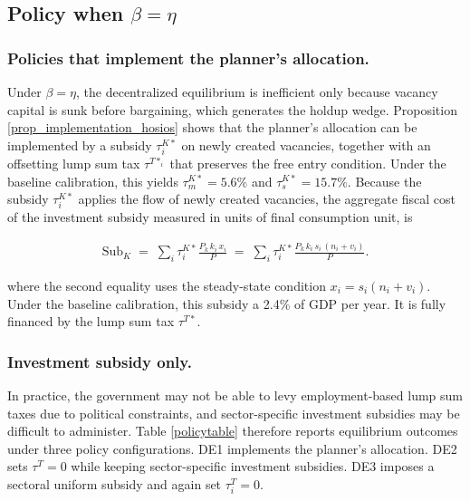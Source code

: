 \documentclass[12pt]{article} %
\theoremstyle{definition}
\begin{document}
\subsection{Policy when $\beta=\eta$}

\subsubsection{Policies that implement the planner's allocation.} Under $\beta=\eta$, the decentralized equilibrium is inefficient only because vacancy capital is sunk before bargaining, which generates the holdup wedge.  Proposition \ref{prop_implementation_hosios} shows that the planner's allocation can be implemented by a subsidy $\tau^{K*}_i$ on newly created vacancies, together with an offsetting lump sum tax $\tau^{T*_i}$ that preserves the free entry condition. Under the baseline calibration,  this yields $\tau^{K*}_m = 5.6\% $ and $\tau_s^{K*}= 15.7\%$. 
Because the subsidy $\tau^{K*}_i$ applies the flow of newly created vacancies, the  
aggregate fiscal cost of the investment subsidy measured in units of final consumption unit, is

\begin{align}
\mathrm{Sub}_K \;=\; \sum_i \tau^{K*}_i \frac{P_k\,k_i\,x_i}{P} \;=\; \sum_i \tau^{K*}_i \frac{P_k\,k_i\,s_i\,(n_i+v_i)}{P}.
\end{align}

where the second equality uses the steady-state condition $x_i = s_i(n_i+v_i)$. 
Under the baseline calibration, this subsidy a 2.4\% of GDP per year. It is fully financed by the lump sum tax $\tau^{T*}$. 



\subsubsection{Investment subsidy  only.}

In practice, the  government may not be able to levy employment-based lump sum taxes due to political constraints, and sector-specific investment subsidies may be difficult to administer. %
Table \ref{policytable} therefore reports equilibrium outcomes under three policy configurations.  DE1 implements the planner's allocation. DE2 sets $\tau^{T}=0$ while keeping sector-specific investment subsidies. DE3 imposes a sectoral uniform subsidy and again set $\tau^T_i=0$.
\end{document}
